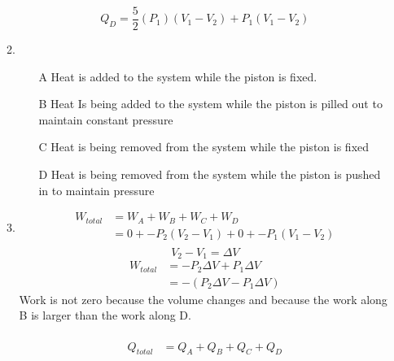 \documentclass{article}
\begin{document}
\begin{enumerate}
\begin{enumerate}
\begin{equation*}
            \end{equation*}
            \begin{equation*}
                Q_D = \frac{5}{2} (P_1)(V_1 - V_2) + P_1(V_1 - V_2)
            \end{equation*}
        \vspace{0.05in}
        \item
            \begin{enumerate}
                \item [A]
                    Heat is added to the system while the piston is fixed.
                \item [B]
                    Heat Is being added to the system while the piston is pilled out to maintain constant pressure
                \item [C]
                    Heat is being removed from the system while the piston is fixed
                \item [D]
                    Heat is being removed from the system while the piston is pushed in to maintain pressure
            \end{enumerate}
        \vspace{0.05in}
        \item
            \begin{align*}
                W_{total} &= W_A + W_B + W_C + W_D \\
                &= 0 + -P_2(V_2 - V_1) + 0 + -P_1(V_1 - V_2) \\
            \end{align*}
            \begin{equation*}
                V_2 - V_1 = \Delta V
            \end{equation*}
            \begin{align*}
                W_{total} &= -P_2 \Delta V + P_1 \Delta V \\
                &= -(P_2 \Delta V - P_1 \Delta V)
            \end{align*}
            Work is not zero because the volume changes and because the work along B is larger than the work along D.
            \\ \\
            \begin{align*}
                Q_{total} &= Q_A + Q_B + Q_C + Q_D \\

\end{align*}
\end{enumerate}
\end{enumerate}
\end{document}
